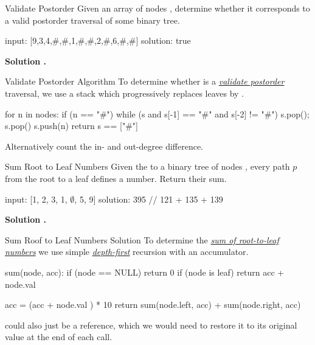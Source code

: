 \documentclass{cognito}
\begin{document}
\begin{note}{Validate Postorder}
	Given an array of nodes , determine whether it corresponds
	to a valid postorder traversal of some binary tree.
	
	\begin{largecode}
 input: [9,3,4,#,#,1,#,#,2,#,6,#,#]
 solution: true
	\end{largecode}
	\bf Solution \hyperref[note:Validate Postorder Algorithm]{\solutionref}.
\end{note}

\begin{note}{Validate Postorder Algorithm}
	To determine whether  is a \hyperref[note:Validate Postorder]{\it validate postorder} traversal,
	we use a stack  which progressively replaces leaves by \incode{\#}.
	\begin{largecode}
for n in nodes:
	if (n == "#")
		while (s and s[-1] == "#" and s[-2] != "#")
			s.pop(); s.pop()
	s.push(n)
 return s == ["#"]
	\end{largecode}
	\begin{remark} Alternatively count the in- and out-degree difference. \end{remark}
	\vspace{-5pt}
\end{note}

\begin{note}{Sum Root to Leaf Numbers}
	Given the  to a binary tree of nodes , every path $p$
	from the root to a leaf defines a number. Return their sum.
	
	\begin{largecode}
 input: [1, 2, 3, 1, $\emptyset$, 5, 9]
 solution: 395 // 121 + 135 + 139
	\end{largecode}
	\bf Solution \hyperref[note:Sum Roof to Leaf Numbers Solution]{\solutionref}.
\end{note}

\begin{note}{Sum Roof to Leaf Numbers Solution}
	To determine the \hyperref[note:Sum Root to Leaf Numbers]{\it sum of root-to-leaf numbers} we use
	simple \hyperref[note:Depth-First Search]{\it depth-first} recursion with an accumulator.
	
	\begin{largecode}
 sum(node, acc):
 	if (node == NULL) return 0
 	if (node is leaf) return acc + node.val
	
	acc = (acc + node.val ) * 10
	return sum(node.left, acc) + sum(node.right, acc)
	\end{largecode}
	\begin{remark}  could also just be a reference, which we would need to restore it to
		its original value at the end of each call. \end{remark}
	\vspace{-5pt}
\end{note}
\end{document}
